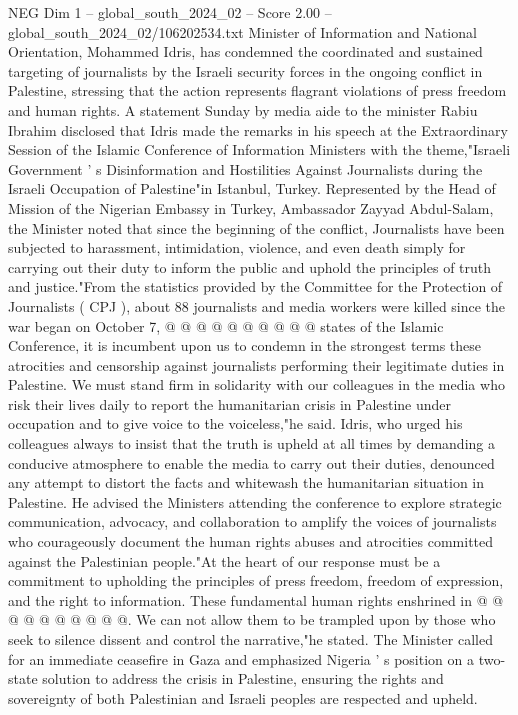 \begin{textsample}{NEG Dim 1 – global\_south\_2024\_02 – Score 2.00 – global\_south\_2024\_02/106202534.txt}  \label{ex:f1_neg_425}
Minister of Information and National Orientation, Mohammed Idris, has condemned the coordinated and sustained targeting of journalists by the Israeli security forces in the ongoing conflict in Palestine, stressing that the action represents flagrant violations of press freedom and human rights.
A statement Sunday by media aide to the minister Rabiu Ibrahim disclosed that Idris made the remarks in his speech at the Extraordinary Session of the Islamic Conference of Information Ministers with the theme,"Israeli Government ' s Disinformation and Hostilities Against Journalists during the Israeli Occupation of Palestine"in Istanbul, Turkey.
Represented by the Head of Mission of the Nigerian Embassy in Turkey, Ambassador Zayyad Abdul-Salam, the Minister noted that since the beginning of the conflict, Journalists have been subjected to harassment, intimidation, violence, and even death simply for carrying out their duty to inform the public and uphold the principles of truth and justice."From the statistics provided by the Committee for the Protection of Journalists ( CPJ ), about 88 journalists and media workers were killed since the war began on October 7, @ @ @ @ @ @ @ @ @ @ states of the Islamic Conference, it is incumbent upon us to condemn in the strongest terms these atrocities and censorship against journalists performing their legitimate duties in Palestine.
We must stand firm in solidarity with our colleagues in the media who risk their lives daily to report the humanitarian crisis in Palestine under occupation and to give voice to the voiceless,"he said.
Idris, who urged his colleagues always to insist that the truth is upheld at all times by demanding a conducive atmosphere to enable the media to carry out their duties, denounced any attempt to distort the facts and whitewash the humanitarian situation in Palestine.
He advised the Ministers attending the conference to explore strategic communication, advocacy, and collaboration to amplify the voices of journalists who courageously document the human rights abuses and atrocities committed against the Palestinian people."At the heart of our response must be a commitment to upholding the principles of press freedom, freedom of expression, and the right to information.
These fundamental human rights enshrined in @ @ @ @ @ @ @ @ @ @.
We can not allow them to be trampled upon by those who seek to silence dissent and control the narrative,"he stated.
The Minister called for an immediate ceasefire in Gaza and emphasized Nigeria ' s position on a two-state solution to address the crisis in Palestine, ensuring the rights and sovereignty of both Palestinian and Israeli peoples are respected and upheld.

\end{textsample}
